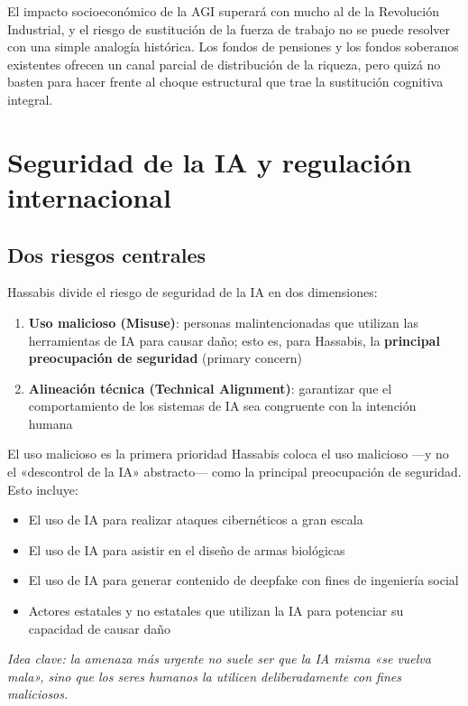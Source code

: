 \documentclass[a4paper]{article}
\begin{document}
El impacto socioeconómico de la AGI superará con mucho al de la Revolución Industrial, y el riesgo de sustitución de la fuerza de trabajo no se puede resolver con una simple analogía histórica. Los fondos de pensiones y los fondos soberanos existentes ofrecen un canal parcial de distribución de la riqueza, pero quizá no basten para hacer frente al choque estructural que trae la sustitución cognitiva integral.

\section{Seguridad de la IA y regulación internacional}

\subsection{Dos riesgos centrales}

Hassabis divide el riesgo de seguridad de la IA en dos dimensiones:

\begin{enumerate}
    \item \textbf{Uso malicioso (Misuse)}: personas malintencionadas que utilizan las herramientas de IA para causar daño; esto es, para Hassabis, la \textbf{principal preocupación de seguridad} (primary concern)
    \item \textbf{Alineación técnica (Technical Alignment)}: garantizar que el comportamiento de los sistemas de IA sea congruente con la intención humana
\end{enumerate}

\begin{importantbox}{El uso malicioso es la primera prioridad}
Hassabis coloca el uso malicioso —y no el «descontrol de la IA» abstracto— como la principal preocupación de seguridad. Esto incluye:
\begin{itemize}
    \item El uso de IA para realizar ataques cibernéticos a gran escala
    \item El uso de IA para asistir en el diseño de armas biológicas
    \item El uso de IA para generar contenido de deepfake con fines de ingeniería social
    \item Actores estatales y no estatales que utilizan la IA para potenciar su capacidad de causar daño
\end{itemize}
\textit{Idea clave: la amenaza más urgente no suele ser que la IA misma «se vuelva mala», sino que los seres humanos la utilicen deliberadamente con fines maliciosos.}
\end{importantbox}
\end{document}

